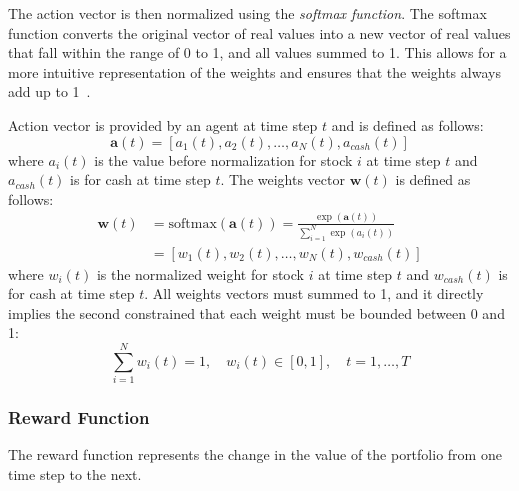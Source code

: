 \documentclass[../xlapes02]{subfiles}
\begin{document}
    The action vector is then normalized using the \emph{softmax function}. The softmax function converts the original vector of real values into a new vector of real values that fall within the range of 0 to 1, and all values summed to 1. This allows for a more intuitive representation of the weights and ensures that the weights always add up to 1~\cite{finrl-portfolio-allocation-2020}.

    Action vector is provided by an agent at time step $t$ and is defined as follows:
    \begin{equation}
        \label{eq:action-vector}
        \bm{a}(t) = [a_1(t), a_2(t), \ldots, a_N(t), a_{cash}(t)]
    \end{equation}
    where $a_i(t)$ is the value before normalization for stock $i$ at time step $t$ and $a_{cash}(t)$ is for cash at time step $t$. The weights vector $\bm{w}(t)$ is defined as follows:
    \begin{equation}
        \label{eq:weights-vector}
        \begin{split}
            \bm{w}(t) &= \text{softmax}(\bm{a}(t)) = \frac{\exp(\bm{a}(t))}{\sum_{i=1}^{N}\exp(a_i(t))} \\
            &= [w_1(t), w_2(t), \ldots, w_N(t), w_{cash}(t)]
        \end{split}
    \end{equation}
    where $w_i(t)$ is the normalized weight for stock $i$ at time step $t$ and $w_{cash}(t)$ is for cash at time step $t$. All weights vectors must summed to 1, and it directly implies the second constrained that each weight must be bounded between 0 and 1:
    \begin{equation}
        \label{eq:equation-constraint}
        \sum_{i=1}^{N}w_i(t)=1,\quad w_i(t)\in[0,1],\quad t=1,\ldots,T
    \end{equation}


    \subsubsection{Reward Function}\label{subsubsec:reward-function}
    The reward function represents the change in the value of the portfolio from one time step to the next.
\end{document}
